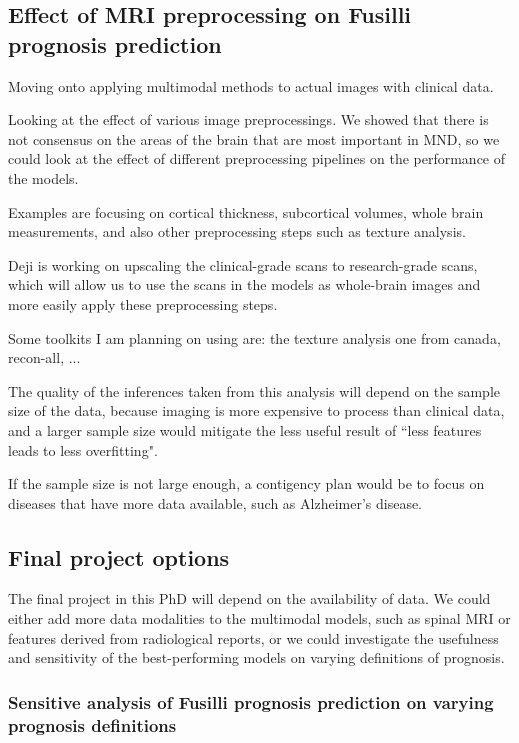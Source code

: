 \subsection{Effect of MRI preprocessing on Fusilli prognosis prediction}

Moving onto applying multimodal methods to actual images with clinical data.

Looking at the effect of various image preprocessings.
We showed that there is not consensus on the areas of the brain that are most important in MND, so we could look at the effect of different preprocessing pipelines on the performance of the models.

Examples are focusing on cortical thickness, subcortical volumes, whole brain measurements, and also other preprocessing steps such as texture analysis.

Deji is working on upscaling the clinical-grade scans to research-grade scans, which will allow us to use the scans in the models as whole-brain images and more easily apply these preprocessing steps.

Some toolkits I am planning on using are: the texture analysis one from canada, recon-all, ...

The quality of the inferences taken from this analysis will depend on the sample size of the data, because imaging is more expensive to process than clinical data, and a larger sample size would mitigate the less useful result of ``less features leads to less overfitting".

If the sample size is not large enough, a contigency plan would be to focus on diseases that have more data available, such as Alzheimer's disease.

\subsection{Final project options}

The final project in this PhD will depend on the availability of data.
We could either add more data modalities to the multimodal models, such as spinal MRI or features derived from radiological reports, or we could investigate the usefulness and sensitivity of the best-performing models on varying definitions of prognosis.

\subsubsection*{Sensitive analysis of Fusilli prognosis prediction on varying prognosis definitions}

